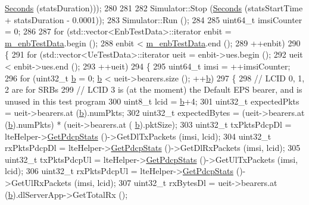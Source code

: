 \begin{DoxyCode}
      \hyperlink{group__timecivil_ga33c34b816f8ff6628e33d5c8e9713b9e}{Seconds} (statsDuration)));
280   
281   
282   Simulator::Stop (\hyperlink{group__timecivil_ga33c34b816f8ff6628e33d5c8e9713b9e}{Seconds} (statsStartTime + statsDuration - 0.0001));  
283   Simulator::Run ();
284 
285   uint64\_t imsiCounter = 0;
286 
287   \textcolor{keywordflow}{for} (std::vector<EnbTestData>::iterator enbit = \hyperlink{classLteEpcE2eDataTestCase_aa2d95eb5a8d25e0d6caa7dbdbe77a85e}{m\_enbTestData}.begin ();
288        enbit < \hyperlink{classLteEpcE2eDataTestCase_aa2d95eb5a8d25e0d6caa7dbdbe77a85e}{m\_enbTestData}.end ();
289        ++enbit)
290     \{
291       \textcolor{keywordflow}{for} (std::vector<UeTestData>::iterator ueit = enbit->ues.begin ();
292            ueit < enbit->ues.end ();
293            ++ueit)
294         \{                    
295           uint64\_t imsi = ++imsiCounter;
296           \textcolor{keywordflow}{for} (uint32\_t \hyperlink{buildings__pathloss_8m_a21ad0bd836b90d08f4cf640b4c298e7c}{b} = 0; \hyperlink{buildings__pathloss_8m_a21ad0bd836b90d08f4cf640b4c298e7c}{b} < ueit->bearers.size (); ++\hyperlink{buildings__pathloss_8m_a21ad0bd836b90d08f4cf640b4c298e7c}{b})
297             \{
298               \textcolor{comment}{// LCID 0, 1, 2 are for SRBs}
299               \textcolor{comment}{// LCID 3 is (at the moment) the Default EPS bearer, and is unused in this test program}
300               uint8\_t lcid = \hyperlink{buildings__pathloss_8m_a21ad0bd836b90d08f4cf640b4c298e7c}{b}+4;
301               uint32\_t expectedPkts = ueit->bearers.at (\hyperlink{buildings__pathloss_8m_a21ad0bd836b90d08f4cf640b4c298e7c}{b}).numPkts;
302               uint32\_t expectedBytes = (ueit->bearers.at (\hyperlink{buildings__pathloss_8m_a21ad0bd836b90d08f4cf640b4c298e7c}{b}).numPkts) * (ueit->bearers.at (
      \hyperlink{buildings__pathloss_8m_a21ad0bd836b90d08f4cf640b4c298e7c}{b}).pktSize);
303               uint32\_t txPktsPdcpDl = lteHelper->\hyperlink{classns3_1_1LteHelper_a1017c1f2ee9f5a640c50c25161a57758}{GetPdcpStats} ()->GetDlTxPackets (imsi, lcid);
304               uint32\_t rxPktsPdcpDl = lteHelper->\hyperlink{classns3_1_1LteHelper_a1017c1f2ee9f5a640c50c25161a57758}{GetPdcpStats} ()->GetDlRxPackets (imsi, lcid);
305               uint32\_t txPktsPdcpUl = lteHelper->\hyperlink{classns3_1_1LteHelper_a1017c1f2ee9f5a640c50c25161a57758}{GetPdcpStats} ()->GetUlTxPackets (imsi, lcid);
306               uint32\_t rxPktsPdcpUl = lteHelper->\hyperlink{classns3_1_1LteHelper_a1017c1f2ee9f5a640c50c25161a57758}{GetPdcpStats} ()->GetUlRxPackets (imsi, lcid);
307               uint32\_t rxBytesDl = ueit->bearers.at (\hyperlink{buildings__pathloss_8m_a21ad0bd836b90d08f4cf640b4c298e7c}{b}).dlServerApp->GetTotalRx ();

\end{DoxyCode}
